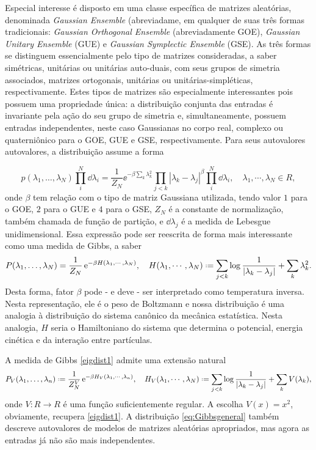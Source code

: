 Especial interesse é disposto em uma classe específica de matrizes aleatórias, denominada \textit{Gaussian Ensemble} (abreviadame, em qualquer de suas três formas tradicionais:  \textit{Gaussian Orthogonal Ensemble} (abreviadamente GOE), \textit{Gaussian Unitary Ensemble} (GUE) e \textit{Gaussian Symplectic Ensemble} (GSE). As três formas se distinguem essencialmente pelo tipo de matrizes consideradas, a saber simétricas, unitárias ou unitárias auto-duais, com seus grupos de simetria associados, matrizes ortogonais, unitárias ou unitárias-simpléticas, respectivamente. Estes tipos de matrizes são especialmente interessantes pois possuem uma propriedade única: a distribuição conjunta das entradas é invariante pela ação do seu grupo de simetria e, simultaneamente, possuem entradas independentes, neste caso Gaussianas no corpo real, complexo ou quaterniônico para o GOE, GUE e GSE, respectivamente. Para seus autovalores autovalores, a distribuição assume a forma

\begin{equation*}
	p(\lambda_1, \ldots, \lambda_N) \prod_{i}^{N}\dd \lambda_i = \frac{1}{Z_N} \ee^{-\beta \sum_{k}\lambda_k^2}\prod_{j<k}|\lambda_k - \lambda_j|^\beta \prod_{i}^{N}\dd \lambda_i , \quad \lambda_1,\cdots, \lambda_N\in R,
\end{equation*}
%
onde $\beta$ tem relação com o tipo de matriz Gaussiana utilizada, tendo valor $1$ para o GOE, $2$ para o GUE e $4$ para o GSE, $Z_N$ é a constante de normalização, também chamada de função de partição, e $\dd\lambda_j$ é a medida de Lebesgue unidimensional. Essa expressão pode ser reescrita de forma mais interessante como uma medida de Gibbs, a saber
%
\begin{equation}\label{eigdist1}
	P(\lambda_1, \ldots, \lambda_N)  = \frac{1}{Z_N} \ee^{-\beta H(\lambda_1,\cdots,\lambda_N)},\quad H(\lambda_1,\cdots,\lambda_N)\deff \sum_{j<k}\log\frac{1}{|\lambda_k - \lambda_j|}+\sum_{k}\lambda_k^2.
\end{equation}
%
Desta forma, fator $\beta$ pode - e deve - ser interpretado como temperatura inversa. Nesta representação, ele é o peso de Boltzmann e nossa distribuição é uma analogia à distribuição do sistema canônico da mecânica estatística. Nesta analogia, $H$ seria o Hamiltoniano do sistema que determina o potencial, energia cinética e da interação entre partículas.

A medida de Gibbs \eqref{eigdist1} admite uma extensão natural
%
\begin{equation}\label{eq:Gibbsgeneral}
	P_V(\lambda_1,\hdots,\lambda_n)\deff \frac{1}{Z^V_N}\ee^{-\beta H_V(\lambda_1,\cdots, \lambda_n)},\quad H_V(\lambda_1,\cdots,\lambda_N)\deff  \sum_{j<k}\log\frac{1}{|\lambda_k - \lambda_j|}+\sum_{k}V(\lambda_k),
\end{equation}
%
onde $V:R\to R$ é uma função suficientemente regular. A escolha $V(x)=x^2$, obviamente, recupera \eqref{eigdist1}. A distribuição \eqref{eq:Gibbsgeneral} também descreve autovalores de modelos de matrizes aleatórias apropriados, mas agora as entradas já não são mais independentes.